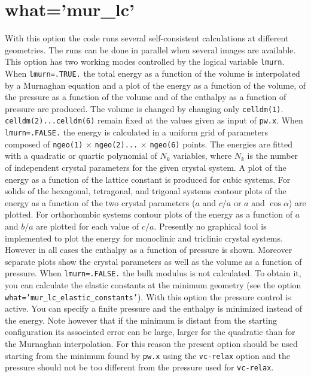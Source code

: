 \documentclass[12pt,a4paper,twoside]{report}
\begin{document}
\newpage
{\color{coral}\section{what='mur\_lc'}}
\color{black}
With this option the code runs several self-consistent calculations
at different geometries. The runs can be done in parallel when several images 
are available. This option has two working modes controlled by the 
logical variable \texttt{lmurn}. When \texttt{lmurn=.TRUE.} the total energy as 
a function of the volume is interpolated by a Murnaghan equation and 
a plot of the energy as a function of the volume, of the pressure 
as a function of the volume and of the enthalpy as a function of
pressure are produced. The volume is changed by 
changing only \texttt{celldm(1)}. \texttt{celldm(2)...celldm(6)} remain fixed
at the values given as input of \texttt{pw.x}. 
When \texttt{lmurn=.FALSE.} the energy is calculated in a uniform
grid of parameters composed of \texttt{ngeo(1)} $\times$ \texttt{ngeo(2)...}
$\times$ \texttt{ngeo(6)} points.
The energies are fitted with a quadratic or quartic polynomial of
$N_k$ variables, where $N_k$ is the number of independent crystal
parameters for the given crystal system. A plot of the energy as 
a function of the lattice constant is produced for cubic systems.
For solids of the hexagonal, tetragonal, and trigonal systems
contour plots of the energy as a function of the two crystal parameters
($a$ and $c/a$ or $a$ and $\cos\alpha$)
are plotted. For orthorhombic systems contour plots of the energy as a function
of $a$ and $b/a$ are plotted for each value of $c/a$. 
Presently no graphical tool is implemented to plot the energy
for monoclinic and triclinic crystal systems. However in all cases
the enthalpy as a function of pressure is shown. Moreover
separate plots show the crystal parameters as well as the volume as 
a function of pressure.
When \texttt{lmurn=.FALSE.} the bulk modulus
is not calculated. To obtain it, you can calculate the elastic constants at the
minimum geometry (see the option \texttt{what='mur\_lc\_elastic\_constants'}). 
With this option the pressure control is active. You can specify a 
finite pressure and the enthalpy is minimized instead of the
energy. Note however that if the minimum is distant from the starting
configuration its associated error can be large, larger for the
quadratic than for the Murnaghan interpolation. For this
reason the present option should be used starting from the minimum found by
\texttt{pw.x} using the \texttt{vc-relax} option and the pressure 
should not be too different from the pressure used for \texttt{vc-relax}.
\end{document}
